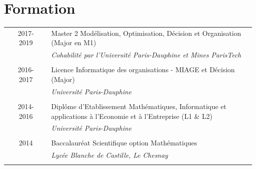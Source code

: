 \documentclass[a4paper,10pt]{article}
\begin{document}
\section{Formation}
\begin{tabular}{p{0.15cm} c p{0.15cm}|p{12.5cm}}
 & \textsc{2017-2019} & & Master 2 Modélisation, Optimisation, Décision et Organisation (Major en M1)\\&&&\emph{\small{Cohabilité par l'Université Paris-Dauphine et Mines ParisTech}}\\\multicolumn{2}{c}{} \\
 & \textsc{2016-2017} & & Licence Informatique des organisations - MIAGE et Décision (Major)\\&&&\emph{\small{Université Paris-Dauphine}}\\\multicolumn{2}{c}{} \\
 & \textsc{2014-2016} & & Diplôme d'Etablissement Mathématiques, Informatique et applications à l'Economie et à l'Entreprise (L1 \& L2) \\&&&\emph{\small{Université Paris-Dauphine}}\\\multicolumn{2}{c}{} \\
 &\textsc{2014} & & Baccalauréat Scientifique option Mathématiques \\&&&\emph{\small{Lycée Blanche de Castille, Le Chesnay}}\\\\
\end{tabular}
\titlespacing{\section}{0pt}{2pt}{2pt}
\end{document}
